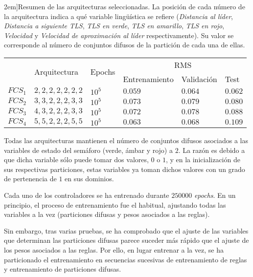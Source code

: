 \begin{table*}
	\centering
	\caption[Resumen de las arquitecturas \ac{fcs} para el modelo longitudinal][2em]{Resumen de las arquitecturas seleccionadas. La posición de cada número de la arquitectura indica a qué variable lingüística se refiere (\textit{Distancia al líder}, \textit{Distancia a siguiente TLS}, \textit{TLS en verde}, \textit{TLS en amarillo}, \textit{TLS en rojo}, \textit{Velocidad} y \textit{Velocidad de aproximación al líder} respectivamente). Su valor se corresponde al número de conjuntos difusos de la partición de cada una de ellas.}
	\label{tbl:cf-fcs-architectures}
	\begin{tabularx}{\linewidth}{XXXXXX}
		\toprule
		\multirow{2}{*}{} & \multirow{2}{*}{Arquitectura} & \multirow{2}{*}{Epochs} & \multicolumn{3}{c}{RMS}      \\ 
		& & & Entrenamiento & Validación & Test \\
		\midrule
		\rowcolor{black!20} $FCS_1$ & $2, 2, 2, 2, 2, 2, 2$ & $10^5$ & $0.059$ & $0.064$ & $0.062$  \\
		$FCS_2$ & $3, 3, 2, 2, 2, 3, 3$ & $10^5$ & $0.073$ & $0.079$ & $0.080$  \\
		\rowcolor{black!20} $FCS_3$ & $4, 3, 2, 2, 2, 3, 3$ & $10^5$ & $0.072$ & $0.078$ & $0.088$  \\
		$FCS_4$ & $5, 5, 2, 2, 2, 5, 5$ & $10^5$ & $0.063$ & $0.068$ & $0.109$  \\
		\bottomrule
	\end{tabularx}
\end{table*}

Todas las arquitecturas mantienen el número de conjuntos difusos asociados a las variables de estado del semáforo (verde, ámbar y rojo) a $2$. La razón es debido a que dicha variable sólo puede tomar dos valores, $0$ o $1$, y en la inicialización de sus respectivas particiones, estas variables ya toman dichos valores con un grado de pertenencia de $1$ en sus dominios.

Cada uno de los controladores se ha entrenado durante $250000$ \textit{epochs}. En un principio, el proceso de entrenamiento fue el habitual, ajustando todas las variables a la vez (particiones difusas y pesos asociados a las reglas).

Sin embargo, tras varias pruebas, se ha comprobado que el ajuste de las variables que determinan las particiones difusas parece suceder más rápido que el ajuste de los pesos asociados a las reglas. Por ello, en lugar entrenar a la vez, se ha particionado el entrenamiento en secuencias sucesivas de entrenamiento de reglas y entrenamiento de particiones difusas.

